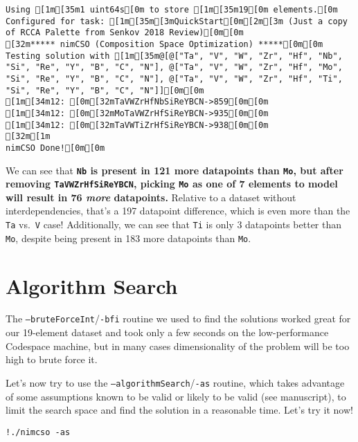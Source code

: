 \begin{verbatim}
Using [1m[35m1 uint64s[0m to store [1m[35m19[0m elements.[0m
Configured for task: [1m[35m[3mQuickStart[0m[2m[3m (Just a copy of RCCA Palette from Senkov 2018 Review)[0m[0m
[32m***** nimCSO (Composition Space Optimization) *****[0m[0m
Testing solution with [1m[35m@[@["Ta", "V", "W", "Zr", "Hf", "Nb", "Si", "Re", "Y", "B", "C", "N"], @["Ta", "V", "W", "Zr", "Hf", "Mo", "Si", "Re", "Y", "B", "C", "N"], @["Ta", "V", "W", "Zr", "Hf", "Ti", "Si", "Re", "Y", "B", "C", "N"]][0m[0m
[1m[34m12: [0m[32mTaVWZrHfNbSiReYBCN->859[0m[0m
[1m[34m12: [0m[32mMoTaVWZrHfSiReYBCN->935[0m[0m
[1m[34m12: [0m[32mTaVWTiZrHfSiReYBCN->938[0m[0m
[32m[1m
nimCSO Done![0m[0m
\end{verbatim}

We can see that \textbf{\texttt{Nb} is present in 121
more datapoints than \texttt{Mo}, but after removing
\texttt{TaVWZrHfSiReYBCN}, picking
\texttt{Mo} as one of 7 elements to model will result
in 76 \emph{more} datapoints.} Relative to a dataset without
interdependencies, that's a 197 datapoint difference, which is even more
than the \texttt{Ta} vs.~\texttt{V}
case! Additionally, we can see that \texttt{Ti} is only
3 datapoints better than \texttt{Mo}, despite being
present in 183 more datapoints than \texttt{Mo}.

\hypertarget{algorithm-search}{%
\section{Algorithm Search}\label{nimcsotutorial:algorithm-search}}

The
\texttt{--bruteForceInt}/\texttt{-bfi}
routine we used to find the solutions worked great for our 19-element
dataset and took only a few seconds on the low-performance Codespace
machine, but in many cases dimensionality of the problem will be too
high to brute force it.

Let's now try to use the
\texttt{--algorithmSearch}/\texttt{-as}
routine, which takes advantage of some assumptions known to be valid or
likely to be valid (see manuscript), to limit the search space and find
the solution in a reasonable time. Let's try it now!

\begin{verbatim}
!./nimcso -as
\end{verbatim}

